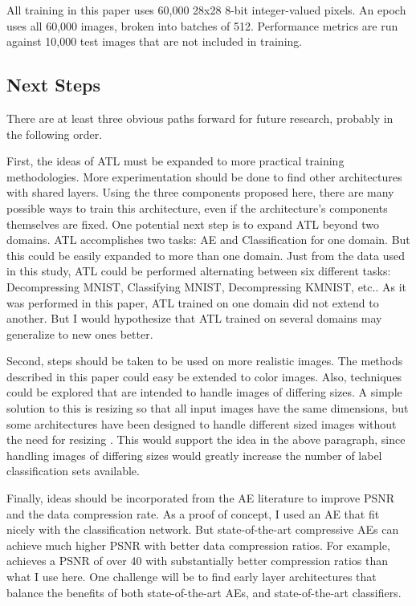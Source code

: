 \documentclass[twoside,11pt]{article}
\begin{document}
All training in this paper uses 60,000 28x28 8-bit integer-valued pixels.
An epoch uses all 60,000 images, broken into batches of 512. Performance metrics are
run against 10,000 test images that are not included in training.

\subsection{Next Steps}

There are at least three obvious paths forward for future research, probably in the following order.

First, the ideas of ATL must be expanded to more practical training methodologies. 
More experimentation should be done to find other architectures with shared layers.
Using the three components proposed here, there are many possible 
ways to train this architecture, even if the architecture's components themselves are fixed.
One potential next step is to expand ATL beyond two domains. ATL accomplishes two tasks:
AE and Classification for one domain. But this could be easily expanded to more than one domain. 
Just from the data used in this study, ATL could be performed alternating between six different 
tasks: Decompressing MNIST, Classifying MNIST, Decompressing KMNIST, etc..
As it was performed in this paper, ATL trained on one domain did not extend to another.
But I would hypothesize that ATL trained on several domains may generalize to new ones better.  

Second, steps should be taken to be used on more realistic images. The methods described
in this paper could easy be extended to color images. Also, techniques could be explored that
are intended to handle images of differing sizes. A simple solution to this is resizing
so that all input images have the same dimensions,
but some architectures have been designed to handle different sized images
without the need for resizing \citep{Iandola2016ExploringTD}.
This would support the idea in the above paragraph, since handling images of differing sizes
would greatly increase the number of label classification sets available.


Finally, ideas should be incorporated from the AE literature to improve PSNR and the 
data compression rate. 
As a proof of concept, I used an AE that fit nicely with the classification network.
But state-of-the-art compressive AEs can achieve much higher PSNR with better data
compression ratios. For example, \citet{theis2017} achieves a PSNR of over 40 with 
substantially better compression ratios than what I use here. 
One challenge will be to find early layer architectures that balance the benefits
of both state-of-the-art
AEs, and state-of-the-art classifiers.  
\end{document}
